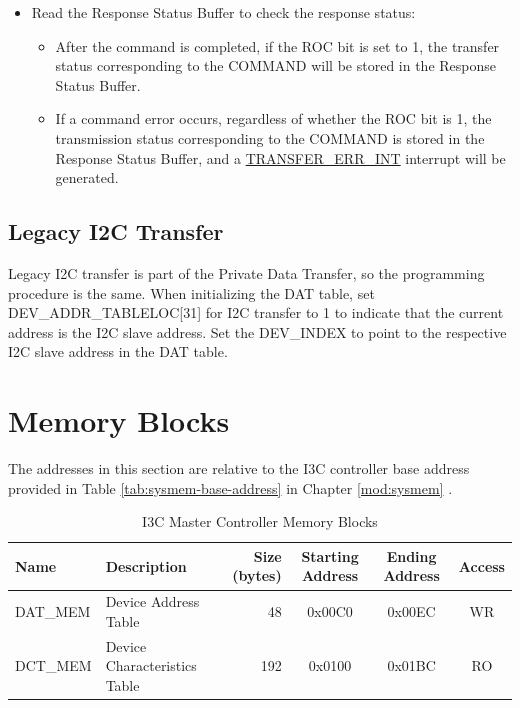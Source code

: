 \documentclass[main\_\_EN.tex]{subfiles}
\begin{document}
\begin{itemize}
    \item Read the Response Status Buffer to check the response status:
    \begin{itemize}
        \item After the command is completed, if the ROC bit is set to 1, the transfer status corresponding to the COMMAND will be stored in the Response Status Buffer.
        \item If a command error occurs, regardless of whether the ROC bit is 1, the transmission status corresponding to the COMMAND is stored in the Response Status Buffer, and a \hyperref[int:TRANSFERERRINT]{TRANSFER\_ERR\_INT} interrupt will be generated.
    \end{itemize}
\end{itemize}

\subsection{Legacy I2C Transfer}
Legacy I2C transfer is part of the Private Data Transfer, so the programming procedure is the same. When initializing the DAT table, set DEV\_ADDR\_TABLELOC[31] for I2C transfer to 1 to indicate that the current address is the I2C slave address. Set the DEV\_INDEX to point to the respective I2C slave address in the DAT table.


\section{Memory Blocks}


The addresses in this section are relative to the I3C controller base address provided in Table \ref{tab:sysmem-base-address} in Chapter \ref{mod:sysmem} \textit{}.

\begin{longtable}{ | p{3cm} | p{3cm} | r | c | c | c | }
\caption{I3C Master Controller Memory Blocks} \label{dat-dct}
\\ \hline
\rowcolor{lightgray}
Name & Description  &  Size (bytes)  &  Starting Address  &  Ending Address  & Access   \\ \hline
DAT\_MEM\label{TBD1} & Device Address Table  &  48 &  0x00C0  &  0x00EC  &  WR  \\ \hline
DCT\_MEM\label{TBD2} & Device Characteristics Table  &   192  &  0x0100  &  0x01BC  &  RO  \\  \hline
\end{longtable}
\end{document}
